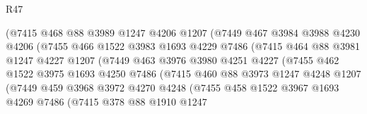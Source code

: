 \begin{lexlean}{R47}
\begin{coremodule}
                        (@7415
                          @468
                          @88
                          @3989
                          @1247
                          @4206
                          @1207
                          (@7449
                            @467
                            @3984
                            @3988
                            @4230
                            @4206
                            (@7455
                              @466
                              @1522
                              @3983
                              @1693
                              @4229
                              @7486
                              (@7415
                                @464
                                @88
                                @3981
                                @1247
                                @4227
                                @1207
                                (@7449
                                  @463
                                  @3976
                                  @3980
                                  @4251
                                  @4227
                                  (@7455
                                    @462
                                    @1522
                                    @3975
                                    @1693
                                    @4250
                                    @7486
                                    (@7415
                                      @460
                                      @88
                                      @3973
                                      @1247
                                      @4248
                                      @1207
                                      (@7449
                                        @459
                                        @3968
                                        @3972
                                        @4270
                                        @4248
                                        (@7455
                                          @458
                                          @1522
                                          @3967
                                          @1693
                                          @4269
                                          @7486
                                          (@7415
                                            @378
                                            @88
                                            @1910
                                            @1247

\end{coremodule}
\end{lexlean}
